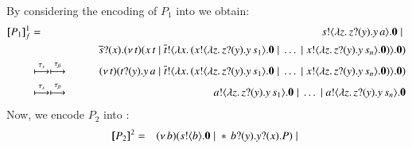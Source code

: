 \documentclass[runningheads]{llncs}
\begin{document}
{%
\noi 
By considering the encoding of $P_1$ into \HO   
we obtain:
\begin{eqnarray*}
[\!\![P_1]\!\!]^{1}_f & = &  	s ! \langle \lambda z.\,z ? (y) . y\, {a} \rangle . \mathbf{0} \;|\; \\
& & \quad \quad \overline{s} ? (x) . (\nu\, t)(x\, {t} \;|\; \overline{t} ! \langle \lambda x.\,(x ! \langle \lambda z.\,z ? (y) . y\, {s_1} \rangle . \mathbf{0} \;|\; \dots \;|\; x ! \langle \lambda z.\,z ? (y) . y\, {s_n} \rangle . \mathbf{0}) \rangle . \mathbf{0})\\
	& \stackrel{\tau_{s}}{\longmapsto} \stackrel{\tau_{\beta}}{\longmapsto} & 
	(\nu\, t)(t ? (y) . y\, {a} \;|\; \overline{t} ! \langle \lambda x.\,(x ! \langle \lambda z.\,z ? (y) . y\, {s_1} \rangle . \mathbf{0} \;|\; \dots \;|\; x ! \langle \lambda z.\,z ? (y) . y\, {s_n} \rangle . \mathbf{0}) \rangle . \mathbf{0})\\
	& \stackrel{\tau_{s}}{\longmapsto}\stackrel{\tau_{\beta}}{\longmapsto}  & 
	a ! \langle \lambda z.\,z ? (y) . y\, {s_1} \rangle . \mathbf{0} \;|\; \dots \;|\; a ! \langle \lambda z.\,z ? (y) . y\, {s_n} \rangle . \mathbf{0}
\end{eqnarray*}
Now, we encode $P_2$ into \sessp:
\begin{eqnarray*}
\pmap{P_2}{2} & = & 	\newsp{b}{\bout{s}{b} \inact \Par \repl \binp{b}{y} \binp{y}{x} P} \Par \\

\end{eqnarray*}}
\end{document}
